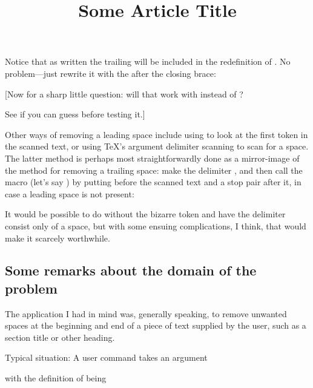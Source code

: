 Notice that as written the trailing  will be included in the
redefinition of \cmd{\foo}. No problem---just rewrite it with the  
after the closing brace:
\begin{lcode}
  \expandafter\def\expandafter\foo\expandafter{\ifdim0pt=0pt\foo}\fi
\end{lcode}

[Now for a sharp little question: will that work with \cmd{\edef} instead of
\cmd{\def}?
\begin{lcode}
\edef\foo{\ifdim0pt=0pt\foo}\fi 
\end{lcode}
See if you can guess before
testing it.]


Other ways of removing a leading space include using \cmd{\futurelet} to
look at the first token in the scanned text, or using TeX's argument
delimiter scanning to scan for a space. The latter method is perhaps
most straightforwardly done as a mirror-image of the method for
removing a trailing space: make the delimiter , and
then call the macro (let's say \cmd{\trimx}) by putting  before 
the
scanned text and a stop pair  after it, in case a
leading space is not present:
It would be possible to do without the bizarre token and have the
delimiter consist only of a space, but with some ensuing
complications, I think, that would make it scarcely worthwhile.

\subsection{Some remarks about the domain of the problem}

The application I had in mind was, generally speaking, to remove
unwanted spaces at the beginning and end of a piece of text supplied
by the user, such as a section title or other heading.

Typical situation: A user command \cmd{\title} takes an argument
\begin{lcode}
  \title{ Some Article Title }
\end{lcode}
with the definition of \cmd{\title} being
\begin{lcode}
  \def\title#1{\def\savedtitle{#1}\trimspaces\savedtitle}
\end{lcode}

